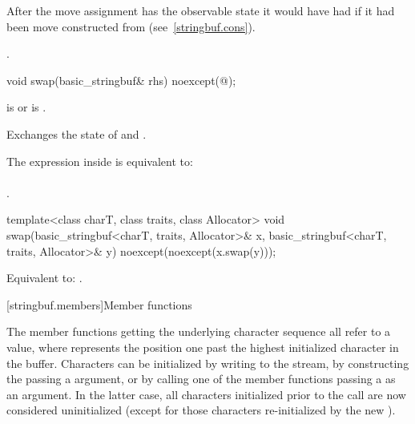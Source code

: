 \begin{itemdescr}
\pnum
\effects
After the move assignment  has the observable state it would
have had if it had been move constructed from  (see~\ref{stringbuf.cons}).

\pnum
\returns
{}.
\end{itemdescr}

%
\begin{itemdecl}
void swap(basic_stringbuf& rhs) noexcept(@\seebelow@);
\end{itemdecl}

\begin{itemdescr}
\pnum
\expects
{}
is  or
 is .

\pnum
\effects
Exchanges the state of 
and .

\pnum
\remarks
The expression inside  is equivalent to:\\
\\
.
\end{itemdescr}

%
\begin{itemdecl}
template<class charT, class traits, class Allocator>
  void swap(basic_stringbuf<charT, traits, Allocator>& x,
            basic_stringbuf<charT, traits, Allocator>& y) noexcept(noexcept(x.swap(y)));
\end{itemdecl}

\begin{itemdescr}
\pnum
\effects
Equivalent to: .
\end{itemdescr}

[stringbuf.members]{Member functions}

\pnum
The member functions getting the underlying character sequence
all refer to a  value,
where  represents the position
one past the highest initialized character in the buffer.
Characters can be initialized by writing to the stream,
by constructing the 
passing a  argument, or
by calling one of the  member functions
passing a  as an argument.
In the latter case, all characters initialized prior to the call
are now considered uninitialized
(except for those characters re-initialized by the new ).

